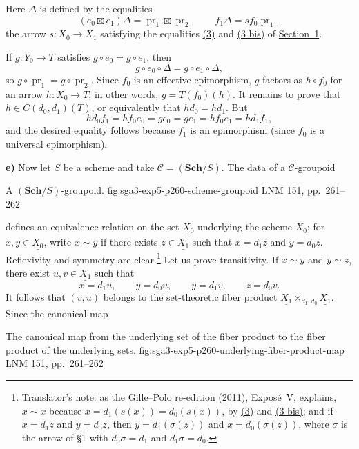 Here \(\Delta\) is defined by the equalities
\[
  (e_0\boxtimes e_1)\Delta=\operatorname{pr}_1\boxtimes\operatorname{pr}_2,
  \qquad f_1\Delta=sf_0\operatorname{pr}_1,
\]
the arrow \(s:X_0\to X_1\) satisfying the equalities
\hyperref[eq:sga3-exp5-3]{(3)} and
\hyperref[eq:sga3-exp5-3bis]{(3 bis)} of \hyperref[sec:sga3-V-1]{Section~1}.

If \(g:Y_0\to T\) satisfies \(g\circ e_0=g\circ e_1\), then
\[
  g\circ e_0\circ\Delta=g\circ e_1\circ\Delta,
\]
so \(g\circ\operatorname{pr}_1=g\circ\operatorname{pr}_2\). Since
\(f_0\) is an effective epimorphism, \(g\) factors as \(h\circ f_0\)
for an arrow \(h:X_0\to T\); in other words,
\(g=T(f_0)(h)\). It remains to prove that
\(h\in C(d_0,d_1)(T)\), or equivalently that \(hd_0=hd_1\). But
\[
  hd_0f_1=hf_0e_0=ge_0=ge_1=hf_0e_1=hd_1f_1,
\]
and the desired equality follows because \(f_1\) is an epimorphism
(since \(f_0\) is a universal epimorphism).

\medskip
{}\label{par:sga3-V-3-e}%
\noindent\textbf{e)} Now let \(S\) be a scheme and take
\(\mathscr C=(\mathbf{Sch}/S)\). The data of a \(\mathscr C\)-groupoid

  {A \((\mathbf{Sch}/S)\)-groupoid.}
  {fig:sga3-exp5-p260-scheme-groupoid}
  {LNM 151, pp.~261--262}

\noindent defines an equivalence relation on the set \(\underline{X_0}\)
underlying the scheme \(X_0\): for \(x,y\in\underline{X_0}\), write
\(x\sim y\) if there exists \(z\in\underline{X_1}\) such that
\(x=d_1z\) and \(y=d_0z\). Reflexivity and symmetry are clear.\footnote{Translator's note: as the Gille--Polo re-edition (2011), Exposé~V,
explains, \(x\sim x\) because \(x=d_1(s(x))=d_0(s(x))\), by \hyperref[eq:sga3-exp5-3]{(3)} and
\hyperref[eq:sga3-exp5-3bis]{(3 bis)}; and if \(x=d_1z\) and \(y=d_0z\), then \(y=d_1(\sigma(z))\) and
\(x=d_0(\sigma(z))\), where \(\sigma\) is the arrow of \S1 with
\(d_0\sigma=d_1\) and \(d_1\sigma=d_0\).}
Let us prove transitivity. If \(x\sim y\) and \(y\sim z\), there exist
\(u,v\in\underline{X_1}\) such that
\[
  x=d_1u,\qquad y=d_0u,\qquad y=d_1v,\qquad z=d_0v.
\]
It follows that \((v,u)\) belongs to the set-theoretic fiber product
\(\underline{X_1}\times_{\underline{d_1},\underline{d_0}}
\underline{X_1}\). Since the canonical map

  {The canonical map from the underlying set of the fiber product to the
  fiber product of the underlying sets.}
  {fig:sga3-exp5-p260-underlying-fiber-product-map}
  {LNM 151, pp.~261--262}

